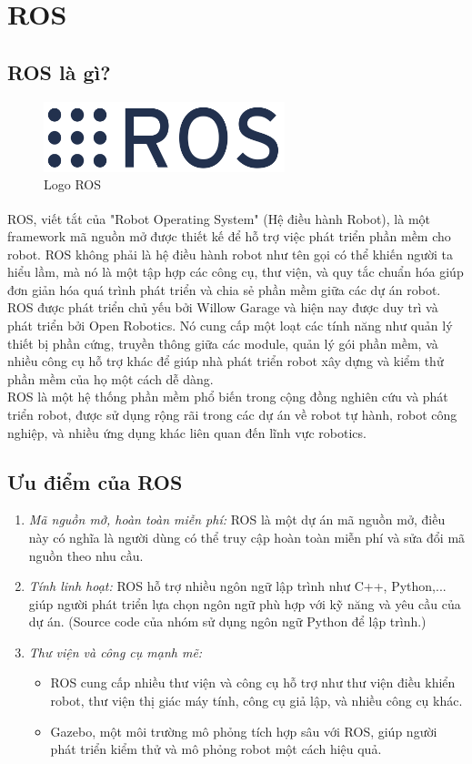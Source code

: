 \section{ROS}
\subsection{ROS là gì?}
\begin{figure}[htp]
\begin{center}
    \includegraphics[width=7cm]{img/2_Theory/ROS.png}
    \caption{Logo ROS}
\end{center}
\end{figure}
\hspace{0.4cm}ROS\textsuperscript{\cite{ros}}, viết tắt của "Robot Operating System" (Hệ điều hành Robot), là một framework mã nguồn mở được thiết kế để hỗ trợ việc phát triển phần mềm cho robot. ROS không phải là hệ điều hành robot như tên gọi có thể khiến người ta hiểu lầm, mà nó là một tập hợp các công cụ, thư viện, và quy tắc chuẩn hóa giúp đơn giản hóa quá trình phát triển và chia sẻ phần mềm giữa các dự án robot.\\
\tab ROS được phát triển chủ yếu bởi Willow Garage và hiện nay được duy trì và phát triển bởi Open Robotics. Nó cung cấp một loạt các tính năng như quản lý thiết bị phần cứng, truyền thông giữa các module, quản lý gói phần mềm, và nhiều công cụ hỗ trợ khác để giúp nhà phát triển robot xây dựng và kiểm thử phần mềm của họ một cách dễ dàng.\\
\tab ROS là một hệ thống phần mềm phổ biến trong cộng đồng nghiên cứu và phát triển robot, được sử dụng rộng rãi trong các dự án về robot tự hành, robot công nghiệp, và nhiều ứng dụng khác liên quan đến lĩnh vực robotics.
\subsection{Ưu điểm của ROS}
\begin{enumerate}
    \item \textit{Mã nguồn mở, hoàn toàn miễn phí:} ROS là một dự án mã nguồn mở, điều này có nghĩa là người dùng có thể truy cập hoàn toàn miễn phí và sửa đổi mã nguồn theo nhu cầu.
    \item \textit{Tính linh hoạt:} ROS hỗ trợ nhiều ngôn ngữ lập trình như C++, Python,... giúp người phát triển lựa chọn ngôn ngữ phù hợp với kỹ năng và yêu cầu của dự án. (Source code của nhóm sử dụng ngôn ngữ Python để lập trình.)
    \item \textit{Thư viện và công cụ mạnh mẽ:}
    \begin{itemize}
        \item ROS cung cấp nhiều thư viện và công cụ hỗ trợ như thư viện điều khiển robot, thư viện thị giác máy tính, công cụ giả lập, và nhiều công cụ khác.
        \item Gazebo, một môi trường mô phỏng tích hợp sâu với ROS, giúp người phát triển kiểm thử và mô phỏng robot một cách hiệu quả.
    \end{itemize}
\end{enumerate}
